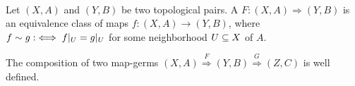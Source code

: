 
 \\
Let $(X, A)$ and $(Y, B)$ be two topological pairs.
A  $F: (X, A) \Rightarrow (Y, B)$ is an equivalence class of maps $f: (X, A) \to (Y, B)$, where
$f \sim g :\iff f\vert_{U} = g\vert_{U}$ for some neighborhood $U \subseteq{} X$ of $A$. 


\begin{remark}
The composition of two map-germs $(X, A) \overset{F}{\Rightarrow} (Y, B) \overset{G}{\Rightarrow} (Z, C)$ is well defined.
\end{remark}